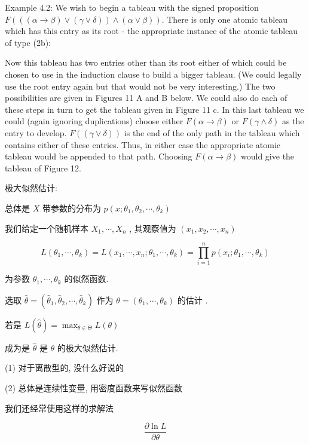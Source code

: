 \documentclass[a4paper, 10pt]{ctexbook} %
\begin{document}
Example 4.2: We wish to begin a tableau with the signed proposition
$F \left( \left(\left(\alpha \to \beta \right) \vee \left(\gamma \vee \delta\right)\right) \wedge \left(\alpha \vee \beta\right)\right)$. There is only one atomic tableau which
has this entry as its root -
the appropriate instance of the atomic tableau of type (2b):


Now this tableau has two entries other than its root either of which
could be chosen to use in the induction clause to build a bigger tableau.
(We could legally use the root entry again but that would not be very
interesting.) The two possibilities are given in Figures 11 A and B below.
We could also do each of these steps in turn to get the tableau given in
Figure 11 c.
In this last tableau we could (again ignoring duplications) choose either
$F\left(\alpha \to \beta\right)$ or $F\left(\gamma \wedge \delta \right)$ as the entry to develop. $F(\left(\gamma \vee \delta \right))$ is the end of
the only path in the tableau which contains either of these entries. Thus,
in either case the appropriate atomic tableau would be appended to that
path. Choosing $F\left(\alpha \to \beta \right)$ would give the tableau of Figure 12.


极大似然估计: 

总体是 $X$ 带参数的分布为 $ p \left(x  ; \theta_1 , \theta_2 , \cdots  , \theta _{k}\right)$ 

我们给定一个随机样本 $X_{1 } , \cdots  ,X_{n}$ , 其观察值为 $\left(x_1 , x_2 ,\cdots  , x_{n}\right)$

$$L \left(\theta _{1} , \cdots  , \theta _{k}\right) = L \left(x_1, \cdots  , x_{n} ; \theta _{1} , \cdots   , \theta _{k}\right)  = \prod _{i=1} ^{n} p \left(x_i ; \theta _{1} , \cdots  ,\theta _{k}\right)$$

为参数 $\theta_1 , \cdots   , \theta _{k}$ 的似然函数. 

选取 $\hat \theta  = \left(\hat \theta _{1}  , \hat \theta _{2} , \cdots  , \hat \theta _{k} \right)$ 作为 $\theta = \left(\theta _{1} , \cdots  , \theta _{k}\right)$ 的估计 .

若是 $L \left(\hat \theta \right) = \max_{\theta \in \Theta}  L \left(\theta \right)$ 

成为是 $\hat \theta $ 是 $\theta $ 的极大似然估计. 

(1) 对于离散型的, 没什么好说的

(2) 总体是连续性变量, 用密度函数来写似然函数 

我们还经常使用这样的求解法

$$\frac{\partial \ln L}{\partial \theta}$$
\end{document}
